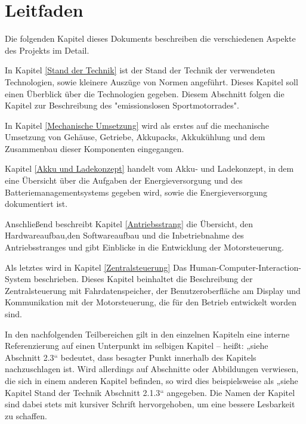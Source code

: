 \section{Leitfaden}

Die folgenden Kapitel dieses Dokuments beschreiben die verschiedenen Aspekte des Projekts im Detail. 

In Kapitel \ref{Stand der Technik} ist der Stand der Technik der verwendeten Technologien, sowie kleinere Auszüge von Normen angeführt. Dieses Kapitel soll einen Überblick über die Technologien gegeben. Diesem Abschnitt folgen die Kapitel zur Beschreibung des "emissionslosen Sportmotorrades". 

In Kapitel \ref{Mechanische Umsetzung} wird als erstes auf die mechanische Umsetzung von Gehäuse, Getriebe, Akkupacks, Akkukühlung und dem Zusammenbau dieser Komponenten eingegangen. 

Kapitel \ref{Akku und Ladekonzept} handelt vom Akku- und Ladekonzept, in dem eine Übersicht über die Aufgaben der Energieversorgung und des Batteriemanagementsystems gegeben wird, sowie die Energieversorgung dokumentiert ist. 

Anschließend beschreibt Kapitel \ref{Antriebsstrang} die Übersicht, den Hardwareaufbau,den Softwareaufbau und die Inbetriebnahme des Antriebsstranges und gibt Einblicke in die Entwicklung der Motorsteuerung. 

Als letztes wird in Kapitel \ref{Zentralsteuerung} Das Human-Computer-Interaction-System beschrieben. Dieses Kapitel beinhaltet die Beschreibung der Zentralsteuerung mit Fahrdatenspeicher, der Benutzeroberfläche am Display und Kommunikation mit der Motorsteuerung, die für den Betrieb entwickelt worden sind.

In den nachfolgenden Teilbereichen gilt in den einzelnen Kapiteln eine interne Referenzierung auf einen Unterpunkt im selbigen Kapitel – heißt: „siehe Abschnitt 2.3“ bedeutet, dass besagter Punkt innerhalb des Kapitels nachzuschlagen ist. Wird allerdings auf Abschnitte oder Abbildungen verwiesen, die sich in einem anderen Kapitel befinden, so wird dies beispielsweise als „siehe Kapitel Stand der Technik Abschnitt 2.1.3“ angegeben. Die Namen der Kapitel sind dabei stets mit kursiver Schrift hervorgehoben, um eine bessere Lesbarkeit zu schaffen.